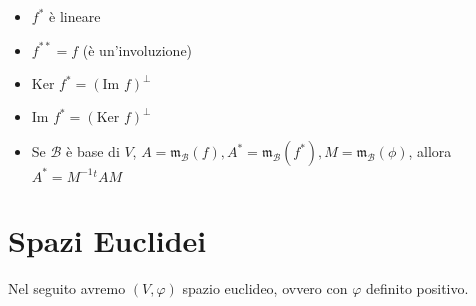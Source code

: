 \documentclass[a4paper,NoNotes]{stdmdoc}
\newcommand{\Ker}{\mbox{Ker } }
\newcommand{\Img}{\mbox{Im }}
\newcommand{\Mtr}{\mathfrak{m}}
\begin{document}
	\begin{itemize}
		\item $f^{*}$ è lineare
		\item $f^{**} = f$ (è un'involuzione)
		\item $\Ker f^{*} = (\Img f)^\bot$
		\item $\Img f^{*} = (\Ker f)^\bot$
		\item Se $\mathcal{B}$ è base di $V$, $A = \Mtr_{\mathcal{B}}(f), A^{*} = \Mtr_{\mathcal{B}}(f^{*}), M = \Mtr_{\mathcal{B}}(\phi)$, allora $A^{*} = M^{-1}{}^tAM$
	\end{itemize}

	\section*{Spazi Euclidei}
	Nel seguito avremo $(V, \varphi)$ spazio euclideo, ovvero con $\varphi$ definito positivo.
\end{document}
